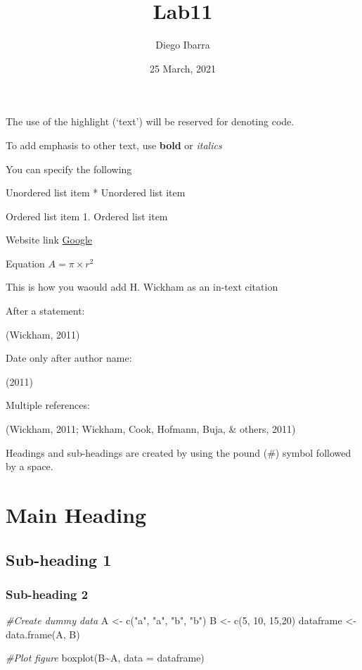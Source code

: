 \documentclass[
  12pt,
]{article}
\title{Lab11}
\author{Diego Ibarra}
\date{25 March, 2021}
\newenvironment{Shaded}{\begin{snugshade}}{\end{snugshade}}
\newcommand{\AttributeTok}[1]{\textcolor[rgb]{0.77,0.63,0.00}{#1}}
\newcommand{\CommentTok}[1]{\textcolor[rgb]{0.56,0.35,0.01}{\textit{#1}}}
\newcommand{\DecValTok}[1]{\textcolor[rgb]{0.00,0.00,0.81}{#1}}
\newcommand{\FunctionTok}[1]{\textcolor[rgb]{0.00,0.00,0.00}{#1}}
\newcommand{\NormalTok}[1]{#1}
\newcommand{\OtherTok}[1]{\textcolor[rgb]{0.56,0.35,0.01}{#1}}
\newcommand{\SpecialCharTok}[1]{\textcolor[rgb]{0.00,0.00,0.00}{#1}}
\newcommand{\StringTok}[1]{\textcolor[rgb]{0.31,0.60,0.02}{#1}}
\begin{document}
\maketitle

The use of the highlight (`text') will be reserved for denoting code.

To add emphasis to other text, use \textbf{bold} or \emph{italics}

You can specify the following

Unordered list item * Unordered list item

Ordered list item 1. Ordered list item

Website link \href{https://www.google.com}{Google}

Equation \(A =\pi \times r^{2}\)

This is how you waould add H. Wickham as an in-text citation

After a statement:

(Wickham, 2011)

Date only after author name:

(2011)

Multiple references:

(Wickham, 2011; Wickham, Cook, Hofmann, Buja, \& others, 2011)

Headings and sub-headings are created by using the pound (\#) symbol
followed by a space.

\hypertarget{main-heading}{%
\section{Main Heading}\label{main-heading}}

\hypertarget{sub-heading-1}{%
\subsection{Sub-heading 1}\label{sub-heading-1}}

\hypertarget{sub-heading-2}{%
\subsubsection{Sub-heading 2}\label{sub-heading-2}}

\begin{Shaded}
\begin{Highlighting}[]
\CommentTok{\#Create dummy data}
\NormalTok{A }\OtherTok{\textless{}{-}} \FunctionTok{c}\NormalTok{(}\StringTok{"a"}\NormalTok{, }\StringTok{"a"}\NormalTok{, }\StringTok{"b"}\NormalTok{, }\StringTok{"b"}\NormalTok{)}
\NormalTok{B }\OtherTok{\textless{}{-}} \FunctionTok{c}\NormalTok{(}\DecValTok{5}\NormalTok{, }\DecValTok{10}\NormalTok{, }\DecValTok{15}\NormalTok{,}\DecValTok{20}\NormalTok{)}
\NormalTok{dataframe }\OtherTok{\textless{}{-}} \FunctionTok{data.frame}\NormalTok{(A, B)}

\CommentTok{\#Plot figure}
\FunctionTok{boxplot}\NormalTok{(B}\SpecialCharTok{\textasciitilde{}}\NormalTok{A, }\AttributeTok{data =}\NormalTok{  dataframe)}
\end{Highlighting}
\end{Shaded}
\end{document}
